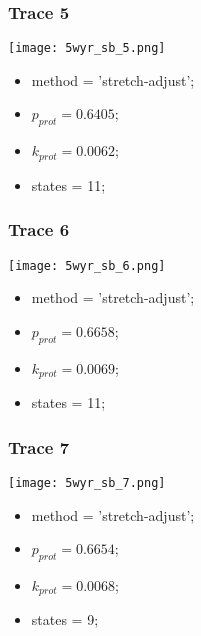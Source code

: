 \subsubsection{Trace 5}
\begin{minipage}[c]{0.7\textwidth}
    \texttt{[image: 5wyr\_sb\_5.png]}
\end{minipage}
\hfill
\begin{minipage}[c]{0.45\textwidth}
    \begin{itemize}
        \item method = 'stretch-adjust';
        \item $p_{prot}=0.6405$;
        \item $k_{prot}=0.0062$;
        \item states = 11;
    \end{itemize}
\end{minipage}

\subsubsection{Trace 6}
\begin{minipage}[c]{0.7\textwidth}
    \texttt{[image: 5wyr\_sb\_6.png]}
\end{minipage}
\hfill
\begin{minipage}[c]{0.45\textwidth}
    \begin{itemize}
        \item method = 'stretch-adjust';
        \item $p_{prot}=0.6658$;
        \item $k_{prot}=0.0069$;
        \item states = 11;
    \end{itemize}
\end{minipage}

\subsubsection{Trace 7}
\begin{minipage}[c]{0.7\textwidth}
    \texttt{[image: 5wyr\_sb\_7.png]}
\end{minipage}
\hfill
\begin{minipage}[c]{0.45\textwidth}
    \begin{itemize}
        \item method = 'stretch-adjust';
        \item $p_{prot}=0.6654$;
        \item $k_{prot}=0.0068$;
        \item states = 9;
    \end{itemize}
\end{minipage}

